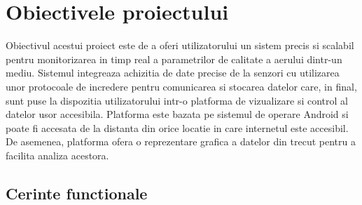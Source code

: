 \chapter{Obiectivele proiectului}\label{ch:obiective}
\pagestyle{fancy}
Obiectivul acestui proiect este de a oferi utilizatorului un sistem precis si scalabil pentru monitorizarea in timp real a parametrilor de calitate a 
aerului dintr-un mediu. Sistemul integreaza achizitia de date precise de la senzori cu utilizarea unor protocoale de incredere pentru comunicarea si 
stocarea datelor care, in final, sunt puse la dispozitia utilizatorului intr-o platforma de vizualizare si control al datelor usor accesibila. 
Platforma este bazata pe sistemul de operare Android si poate fi accesata de la distanta din orice locatie in care internetul este accesibil. 
De asemenea, platforma ofera o reprezentare grafica a datelor din trecut pentru a facilita analiza acestora.

\section{Cerinte functionale}\label{sec:cerinte_functionale}
